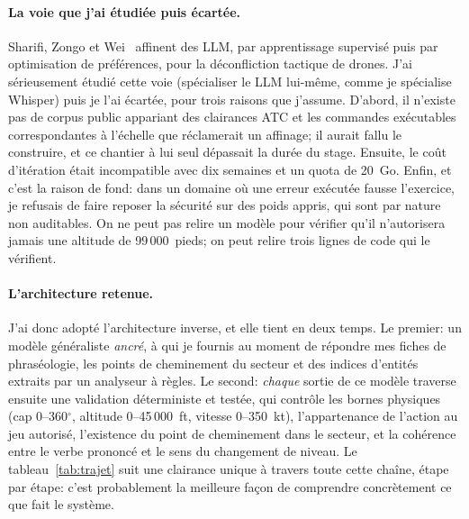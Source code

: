 \documentclass[11pt,a4paper]{article}
\begin{document}
\paragraph{La voie que j'ai étudiée puis écartée.} Sharifi, Zongo et Wei~\cite{sharifi} affinent des LLM, par apprentissage supervisé puis par optimisation de préférences, pour la déconfliction tactique de drones. J'ai sérieusement étudié cette voie (spécialiser le LLM lui-même, comme je spécialise Whisper) puis je l'ai écartée, pour trois raisons que j'assume. D'abord, il n'existe pas de corpus public appariant des clairances ATC et les commandes exécutables correspondantes à l'échelle que réclamerait un affinage; il aurait fallu le construire, et ce chantier à lui seul dépassait la durée du stage. Ensuite, le coût d'itération était incompatible avec dix semaines et un quota de 20~Go. Enfin, et c'est la raison de fond: dans un domaine où une erreur exécutée fausse l'exercice, je refusais de faire reposer la sécurité sur des poids appris, qui sont par nature non auditables. On ne peut pas relire un modèle pour vérifier qu'il n'autorisera jamais une altitude de 99\,000~pieds; on peut relire trois lignes de code qui le vérifient. 

\paragraph{L'architecture retenue.} J'ai donc adopté l'architecture inverse, et elle tient en deux temps. Le premier: un modèle généraliste \emph{ancré}, à qui je fournis au moment de répondre mes fiches de phraséologie, les points de cheminement du secteur et des indices d'entités extraits par un analyseur à règles. Le second: \emph{chaque} sortie de ce modèle traverse ensuite une validation déterministe et testée, qui contrôle les bornes physiques (cap 0--360$^\circ$, altitude 0--45\,000~ft, vitesse 0--350~kt), l'appartenance de l'action au jeu autorisé, l'existence du point de cheminement dans le secteur, et la cohérence entre le verbe prononcé et le sens du changement de niveau. Le tableau~\ref{tab:trajet} suit une clairance unique à travers toute cette chaîne, étape par étape: c'est probablement la meilleure façon de comprendre concrètement ce que fait le système. 
\end{document}

